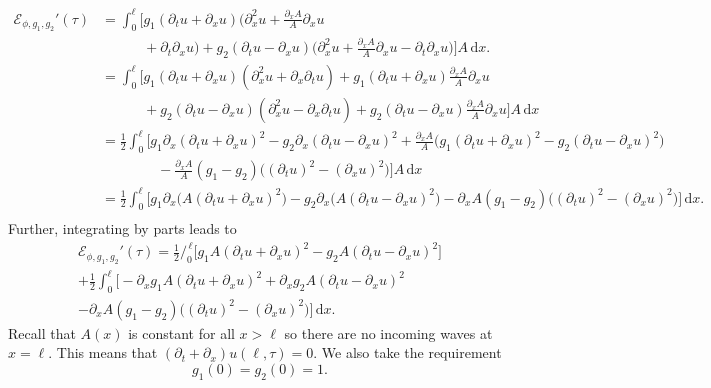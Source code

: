 \documentclass[10pt,a4paper]{article}
\theoremstyle{plain}
\theoremstyle{definition}
\theoremstyle{remark}
\numberwithin{equation}{section}
\newcommand{\intlim}[2]{\bigg/_{\!\!\!\! #1}^{\, #2}}
\newcommand{\dx}{\,\mathrm{d}x}
\begin{document}
    \begin{align*}
      \mathscr{E}_{\phi,g_1,g_2}'(\tau)
      &= \int_0^\ell \Big[ g_1 (\partial_t u + \partial_x u) \Big(\partial_x^2 u + \frac{\partial_x A}{A} \partial_x u \\
      &\qquad\quad + \partial_t\partial_x u\Big)  + g_2 (\partial_t u - \partial_x u) \Big(\partial_x^2 u + \frac{\partial_x A}{A} \partial_x u - \partial_t\partial_x u \Big) \Big] A \dx.  \\
      &= \int_0^\ell \Big[ g_1 (\partial_t u + \partial_x u)(\partial_x^2 u + \partial_x \partial_t u) + g_1 (\partial_t u + \partial_x u) \frac{\partial_x A}{A} \partial_x u \\
      &\qquad\quad + g_2 (\partial_t u - \partial_x u) (\partial_x^2 u - \partial_x \partial_t u) + g_2 (\partial_t u - \partial_x u) \frac{\partial_x A}{A} \partial_x u \Big] A \dx \\
      &= \frac{1}{2} \int_0^\ell \Big[ g_1 \partial_x (\partial_t u + \partial_x u)^2 - g_2 \partial_x (\partial_t u - \partial_x u)^2 + \frac{\partial_x A}{A} \big(g_1 (\partial_t u + \partial_x u)^2 - g_2 (\partial_t u - \partial_x u)^2\big) \\
      &\qquad\qquad - \frac{\partial_x A}{A} (g_1 - g_2) \big((\partial_t u)^2 - (\partial_x u)^2 \big) \Big] A \dx \\
      &= \frac{1}{2} \int_0^\ell \Big[ g_1 \partial_x \big( A (\partial_t u + \partial_x u)^2 \big) - g_2 \partial_x \big( A (\partial_t u - \partial_x u)^2 \big) - \partial_x A (g_1 - g_2) \big( (\partial_t u)^2 - (\partial_x u)^2 \big) \Big] \dx. \\
    \end{align*}
    Further, integrating by parts leads to
    \begin{multline}
      \label{eq:energy-derivative-Calculation}
      \mathscr{E}_{\phi,g_1,g_2}'(\tau) = \frac{1}{2} \intlim{0}{\ell} \Big[ g_1 A (\partial_t u + \partial_x u)^2 - g_2 A (\partial_t u - \partial_x u)^2 \Big] \\
      + \frac{1}{2} \int_0^\ell \Big[ -\partial_x g_1 A (\partial_t u + \partial_x u)^2 + \partial_x g_2 A (\partial_t u - \partial_x u)^2 \\
      - \partial_x A (g_1 - g_2) \big((\partial_t u)^2 - (\partial_x u)^2\big) \Big] \dx.
  \end{multline}
Recall that $A(x)$ is constant for all $x>\ell$ so there are no incoming waves at $x=\ell$. This means that $(\partial_t + \partial_x) u (\ell, \tau)=0$. We also take the requirement
\begin{equation}
  \label{eq:energy-coefficient-zero-values}
  g_1(0) = g_2(0) = 1.
\end{equation}
\end{document}
